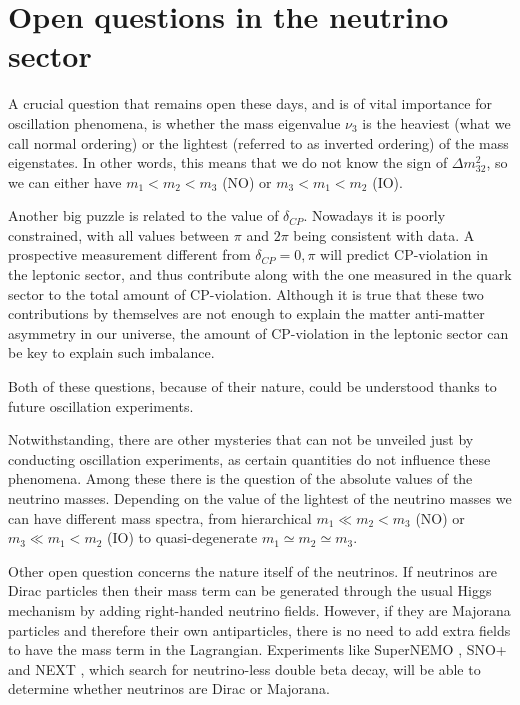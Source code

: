 \section{Open questions in the neutrino sector}

A crucial question that remains open these days, and is of vital importance for oscillation phenomena, is whether the mass eigenvalue $\nu_{3}$ is the heaviest (what we call normal ordering) or the lightest (referred to as inverted ordering) of the mass eigenstates. In other words, this means that we do not know the sign of $\Delta m^{2}_{32}$, so we can either have $m_{1}<m_{2}<m_{3}$ (NO) or $m_{3}<m_{1}<m_{2}$ (IO).

Another big puzzle is related to the value of $\delta_{CP}$. Nowadays it is poorly constrained, with all values between $\pi$ and $2\pi$ being consistent with data. A prospective measurement different from $\delta_{CP}=0,\pi$ will predict CP-violation in the leptonic sector, and thus contribute along with the one measured in the quark sector to the total amount of CP-violation. Although it is true that these two contributions by themselves are not enough to explain the matter anti-matter asymmetry in our universe, the amount of CP-violation in the leptonic sector can be key to explain such imbalance.

Both of these questions, because of their nature, could be understood thanks to future oscillation experiments.

Notwithstanding, there are other mysteries that can not be unveiled just by conducting oscillation experiments, as certain quantities do not influence these phenomena. Among these there is the question of the absolute values of the neutrino masses. Depending on the value of the lightest of the neutrino masses we can have different mass spectra, from hierarchical $m_{1} \ll m_{2}<m_{3}$ (NO) or $m_{3} \ll m_{1}<m_{2}$ (IO) to quasi-degenerate $m_{1} \simeq m_{2} \simeq m_{3}$.

Other open question concerns the nature itself of the neutrinos. If neutrinos are Dirac particles then their mass term can be generated through the usual Higgs mechanism by adding right-handed neutrino fields. However, if they are Majorana particles and therefore their own antiparticles, there is no need to add extra fields to have the mass term in the Lagrangian. Experiments like SuperNEMO \cite{SuperNEMO2010}, SNO+ \cite{SNO2015} and NEXT \cite{NEXT2020}, which search for neutrino-less double beta decay, will be able to determine whether neutrinos are Dirac or Majorana.

